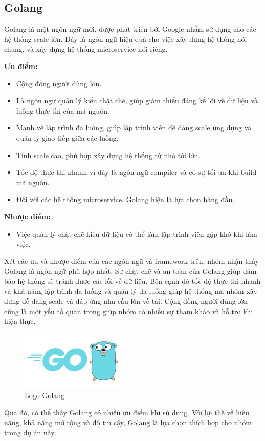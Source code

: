 \subsection{Golang}
Golang là một ngôn ngữ mới, được phát triển bởi Google nhằm sử dụng cho các hệ thống scale lớn. Đây là ngôn ngữ hiệu quả cho việc xây dựng hệ thống nói chung, và xây dựng hệ thống microservice nói riêng.

\textbf{Ưu điểm:}
\begin{itemize}
    \item Cộng đồng người dùng lớn.
    \item Là ngôn ngữ quản lý kiểu chặt chẽ, giúp giảm thiểu đáng kể lỗi về dữ liệu và luồng thực thi của mã nguồn.
    \item Mạnh về lập trình đa luồng, giúp lập trình viên dễ dàng scale ứng dụng và quản lý giao tiếp giữa các luồng.
    \item Tính scale cao, phù hợp xây dựng hệ thống từ nhỏ tới lớn.
    \item Tốc độ thực thi nhanh vì đây là ngôn ngữ compiler và có sự tối ưu khi build mã nguồn.
    \item Đối với các hệ thống microservice, Golang hiện là lựa chọn hàng đầu.
\end{itemize}

\textbf{Nhược điểm:}
\begin{itemize}
    \item Việc quản lý chặt chẽ kiểu dữ liệu có thể làm lập trình viên gặp khó khi làm việc.
\end{itemize}

\hspace{0.5cm}Xét các ưu và nhược điểm của các ngôn ngữ và framework trên, nhóm nhận thấy Golang là ngôn ngữ phù hợp nhất. Sự chặt chẽ và an toàn của Golang giúp đảm bảo hệ thống sẽ tránh được các lỗi về dữ liệu. Bên cạnh đó tốc độ thực thi nhanh và khả năng lập trình đa luồng và quản lý đa luồng giúp hệ thống mà nhóm xây dựng dễ dàng scale và đáp ứng nhu cầu lớn về tải. Cộng đồng người dùng lớn cũng là một yếu tố quan trọng giúp nhóm có nhiều sự tham khảo và hỗ trợ khi hiện thực.

\begin{figure}[!htp]
    \begin{center}
        \includegraphics[width=5cm]{img/Technology/Golang.png}
    \end{center}
    \caption{Logo Golang \cite{technologyGolang}}
\end{figure}

\hspace{0.5cm}Qua đó, có thể thấy Golang có nhiều ưu điểm khi sử dụng. Với lợi thế về hiệu năng, khả năng mở rộng và độ tin cậy, Golang là lựa chọn thích hợp cho nhóm trong dự án này.